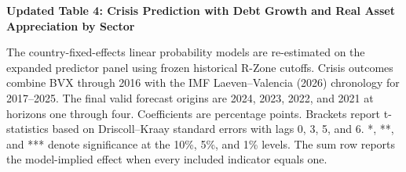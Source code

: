 \documentclass[10pt]{article}
\begin{document}
\noindent\textbf{Updated Table 4: Crisis Prediction with Debt Growth and Real Asset Appreciation by Sector}

\smallskip
\noindent\scriptsize
The country-fixed-effects linear probability models are re-estimated on the
expanded predictor panel using frozen historical R-Zone cutoffs. Crisis
outcomes combine BVX through 2016 with the IMF Laeven--Valencia (2026)
chronology for 2017--2025. The final valid forecast origins are 2024, 2023,
2022, and 2021 at horizons one through four. Coefficients are percentage
points. Brackets report t-statistics based on Driscoll--Kraay standard errors
with lags 0, 3, 5, and 6. *, **, and *** denote significance at the 10\%, 5\%,
and 1\% levels. The sum row reports the model-implied effect when every
included indicator equals one.

\normalsize
\medskip

\end{document}
